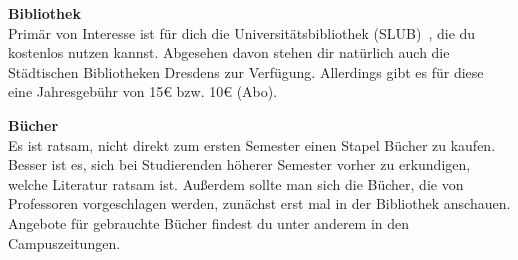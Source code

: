 \begin{multicols}{2}



\textbf{Bibliothek} \\
Primär von Interesse ist für dich die Universitätsbibliothek (SLUB)~, die du kostenlos nutzen kannst.
Abgesehen davon stehen dir natürlich auch die Städtischen Bibliotheken Dresdens zur Verfügung.
Allerdings gibt es für diese eine Jahresgebühr von 15\euro{} bzw. 10\euro{} (Abo).

\textbf{Bücher} \\
Es ist ratsam, nicht direkt zum ersten Semester einen Stapel Bücher zu kaufen.
Besser ist es, sich bei Studierenden höherer Semester vorher zu erkundigen, welche Literatur ratsam ist.
Außerdem sollte man sich die Bücher, die von Professoren vorgeschlagen werden, zunächst erst mal in der Bibliothek anschauen.
Angebote für gebrauchte Bücher findest du unter anderem in den Campuszeitungen.





\end{multicols}
